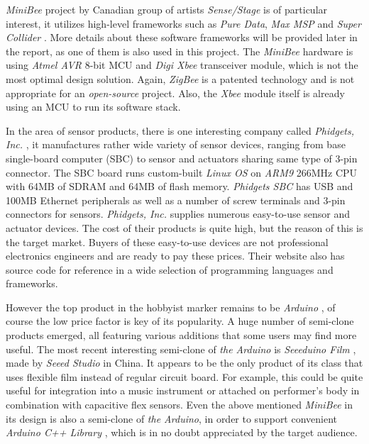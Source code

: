 \emph{MiniBee} project by Canadian group of artists \emph{Sense/Stage}
 \cite{links:sensestage:homepage} is of particular interest, it utilizes
 high-level frameworks such as \emph{Pure Data}, \emph{Max MSP} and
 \emph{Super Collider} \cite{links:sensestage:host}. More details about
 these software frameworks will be provided later in the report, as one
 of them is also used in this project. The \emph{MiniBee} hardware
 \cite{links:sensestage:node} is using \emph{Atmel AVR} 8-bit MCU and
 \emph{Digi Xbee} transceiver module, which is not the most optimal
 design solution. Again, \emph{ZigBee} is a patented technology and
 is not appropriate for an \emph{open-source} project. Also, the
 \emph{Xbee} module itself is already using an MCU to run its software stack.
 
 In the area of sensor products, there is one interesting company called
 \emph{Phidgets, Inc.} \cite{links:phidgets:homepage}, it manufactures rather
 wide variety of sensor devices, ranging from base single-board computer (SBC)
 to sensor and actuators sharing same type of 3-pin connector. The SBC board
 runs custom-built \emph{Linux OS} on \emph{ARM9} 266MHz CPU with 64MB of
 SDRAM and 64MB of flash memory. \emph{Phidgets SBC}
 \cite{links:phidgets:products:sbc} has USB and 100MB Ethernet peripherals as
 well as a number of screw terminals and 3-pin connectors for sensors.
 \emph{Phidgets, Inc.} supplies numerous easy-to-use sensor and actuator
 devices. The cost of their products is quite high, but the reason of
 this is the target market. Buyers of these easy-to-use devices are not
 professional electronics engineers and are ready to pay these prices.
 Their website also has source code for reference in a wide selection of
 programming languages and frameworks.
 
 However the top product in the hobbyist marker remains to be \emph{Arduino}
 \cite{links:arduino:homepage}, of course the low price factor is key of its
 popularity. A huge number of semi-clone products emerged, all featuring
 various additions that some users may find more useful. The most recent
 interesting semi-clone of \emph{the Arduino} is \emph{Seeeduino Film}
 \cite{links:seeed:products:film}, made by \emph{Seeed Studio} in China.
 It appears to be the only product of its class that uses flexible film
 instead of regular circuit board. For example, this could be quite
 useful for integration into a music instrument or attached on performer's
 body in combination with capacitive flex sensors. Even the above mentioned
 \emph{MiniBee} in its design is also a semi-clone of \emph{the Arduino},
 in order to support convenient \emph{Arduino C++ Library}
 \cite{links:arduino:library}, which is in no doubt appreciated by the
 target audience.
